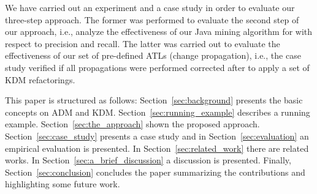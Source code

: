 We have carried out an experiment and a case study in order to evaluate our three-step approach. The former was performed to evaluate the second step of our approach, i.e., analyze the effectiveness of our Java mining algorithm for with respect to precision and recall. The latter was carried out to evaluate the effectiveness of our set of pre-defined ATLs (change propagation), i.e., the case study verified if all propagations were performed corrected after to apply a set of KDM refactorings.

This paper is structured as follows: Section~\ref{sec:background} presents the basic concepts on ADM and KDM. Section~\ref{sec:running_example} describes a running example. 
%
%
 Section~\ref{sec:the_approach} shown the proposed approach. Section~\ref{sec:case_study} presents a case study and in Section~\ref{sec:evaluation} an empirical evaluation is presented. In Section~\ref{sec:related_work} there are related works. In Section~\ref{sec:a_brief_discussion} a discussion is presented. Finally, Section~\ref{sec:conclusion} concludes the paper summarizing the contributions and highlighting some future work.





